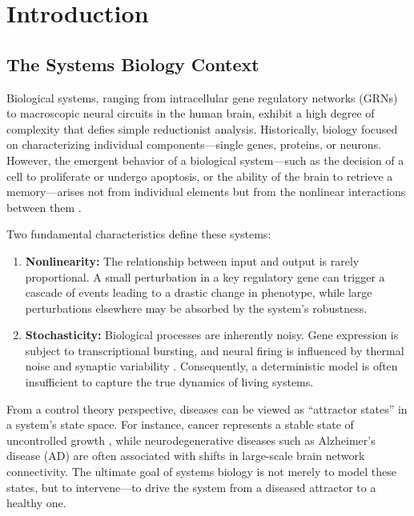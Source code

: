 \documentclass[12pt, a4paper]{report}
\begin{document}
\tableofcontents
\newpage

\chapter{Introduction}

\section{The Systems Biology Context}

Biological systems, ranging from intracellular gene regulatory networks (GRNs) to macroscopic neural circuits in the human brain, exhibit a high degree of complexity that defies simple reductionist analysis. Historically, biology focused on characterizing individual components---single genes, proteins, or neurons. However, the emergent behavior of a biological system---such as the decision of a cell to proliferate or undergo apoptosis, or the ability of the brain to retrieve a memory---arises not from individual elements but from the nonlinear interactions between them \cite{kitano2002systems}.

Two fundamental characteristics define these systems:
\begin{enumerate}
	\item \textbf{Nonlinearity:} The relationship between input and output is rarely proportional. A small perturbation in a key regulatory gene can trigger a cascade of events leading to a drastic change in phenotype, while large perturbations elsewhere may be absorbed by the system's robustness.
	\item \textbf{Stochasticity:} Biological processes are inherently noisy. Gene expression is subject to transcriptional bursting, and neural firing is influenced by thermal noise and synaptic variability \cite{mcadams1997stochastic}. Consequently, a deterministic model is often insufficient to capture the true dynamics of living systems.
\end{enumerate}

From a control theory perspective, diseases can be viewed as ``attractor states'' in a system's state space. For instance, cancer represents a stable state of uncontrolled growth \cite{huang2009cancer}, while neurodegenerative diseases such as Alzheimer's disease (AD) are often associated with shifts in large-scale brain network connectivity. The ultimate goal of systems biology is not merely to model these states, but to intervene---to drive the system from a diseased attractor to a healthy one.
\end{document}
